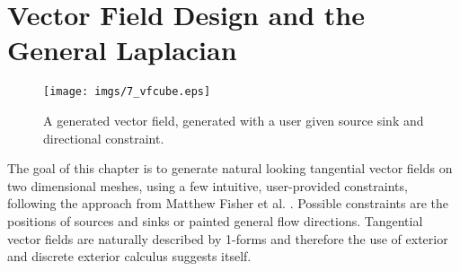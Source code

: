 \chapter{Vector Field Design and the General Laplacian}
\label{chap:vfs}

\begin{figure}[h]%
\begin{center}\hspace{2cm}
\texttt{[image: imgs/7\_vfcube.eps]}%
\end{center}
\caption{A generated vector field, generated with a user given source sink and directional constraint.}%
\label{fig:vfCube}%
\end{figure}

	
The goal of this chapter is to generate natural looking tangential vector fields on two dimensional meshes, using a few intuitive, user-provided constraints, following the approach from Matthew Fisher et al. \cite{vField}. Possible constraints are the positions of sources and sinks or painted general flow directions. Tangential vector fields are naturally described by 1-forms and therefore the use of exterior and discrete exterior calculus suggests itself. 

